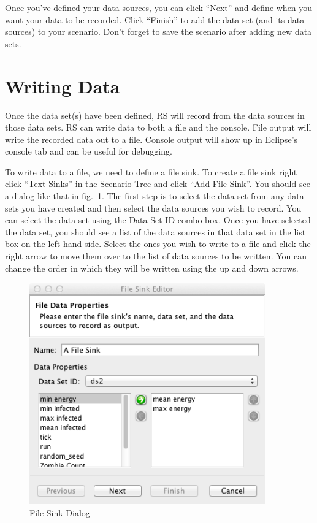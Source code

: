 \documentclass[11pt]{amsart}
\begin{document}
Once you've defined your data sources, you can click ``Next'' and define when you want your data to be recorded. Click ``Finish'' to add the data set (and its data sources) to your scenario. Don't forget to save the scenario after adding new data sets.

\section{Writing Data}
Once the data set(s) have been defined, RS will record from the data sources in those data sets. RS can write data to both a file and the console. File output will write the recorded data out to a file. Console output will show up in Eclipse's console tab and can be useful for debugging. 

To write data to a file, we need to define a file sink. To create a file sink right click ``Text Sinks'' in the Scenario Tree and click ``Add File Sink''. You should see a dialog like that in fig.~\ref{fig:fs}. The first step is to select the data set from any data sets you have created and then select the data sources you wish to record. You can select the data set using the Data Set ID combo box. Once you have selected the data set, you should see a list of the data sources in that data set in the list box on the left hand side. Select the ones you wish to write to a file and click the right arrow to move them over to the list of data sources to be written. You can change the order in which they will be written using the up and down arrows. 

\begin{figure}[h]
\begin{center}
\vspace{.2in}
\centerline {
\includegraphics[width=4in]{images/fs1.png}
}
\caption{File Sink Dialog}
\label{fig:fs}
\end{center}
\end{figure}
\end{document}
